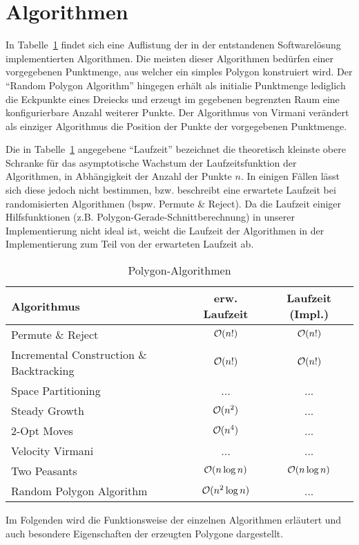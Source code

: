 \section{Algorithmen}
In Tabelle~\ref{algo_table} findet sich eine Auflistung der in der entstandenen Softwarelösung implementierten Algorithmen. Die meisten dieser Algorithmen bedürfen einer vorgegebenen Punktmenge, aus welcher ein simples Polygon konstruiert wird. Der \enquote{Random Polygon Algorithm} hingegen erhält als initialie Punktmenge lediglich die Eckpunkte eines Dreiecks und erzeugt im gegebenen begrenzten Raum eine konfigurierbare Anzahl weiterer Punkte. Der Algorithmus von Virmani verändert als einziger Algorithmus die Position der Punkte der vorgegebenen Punktmenge. 

Die in Tabelle~\ref{algo_table} angegebene \enquote{Laufzeit} bezeichnet die theoretisch kleinste obere Schranke für das asymptotische Wachstum der Laufzeitsfunktion der Algorithmen, in Abhängigkeit der Anzahl der Punkte $n$. In einigen Fällen lässt sich diese jedoch nicht bestimmen, bzw. beschreibt eine erwartete Laufzeit bei randomisierten Algorithmen (bspw. Permute \& Reject). Da die Laufzeit einiger Hilfsfunktionen (z.B. Polygon-Gerade-Schnittberechnung) in unserer Implementierung nicht ideal ist, weicht die Laufzeit der Algorithmen in der Implementierung zum Teil von der erwarteten Laufzeit ab. 

\begin{table}[ht]
\begin{center}
\caption{Polygon-Algorithmen}
\begin{tabular}{lcc} 
\toprule
Algorithmus & erw. Laufzeit & Laufzeit (Impl.) \\
\midrule
Permute \& Reject & $\mathcal{O}(n!)$ & $\mathcal{O}(n!)$ \\
Incremental Construction \& Backtracking & $\mathcal{O}(n!)$ & $\mathcal{O}(n!)$ \\
Space Partitioning & ... & ...\\
Steady Growth & $\mathcal{O}(n^2)$ & ... \\
2-Opt Moves & $\mathcal{O}(n^4)$ & ... \\
Velocity Virmani & ... & ...\\
Two Peasants & $\mathcal{O}(n \log n)$ & $\mathcal{O}(n \log n)$ \\
Random Polygon Algorithm & $\mathcal{O}(n^2 \log n)$ & ... \\
\bottomrule
\end{tabular}
\label{algo_table}
\end{center}
\end{table}

Im Folgenden wird die Funktionsweise der einzelnen Algorithmen erläutert und auch besondere Eigenschaften der erzeugten Polygone dargestellt.